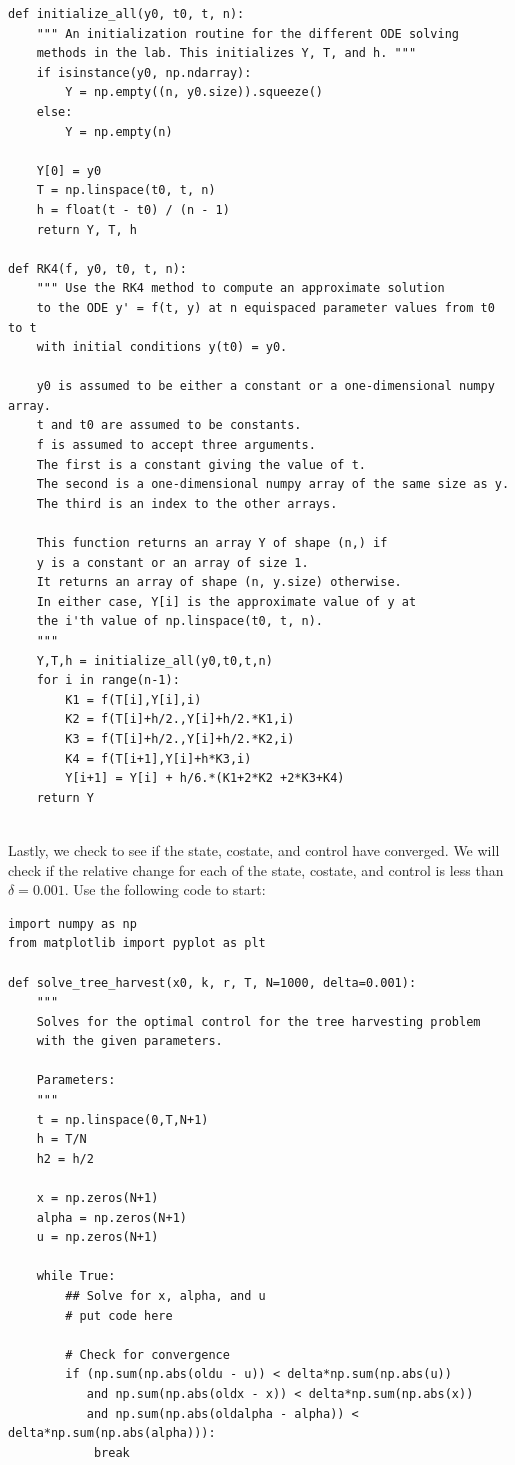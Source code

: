 \begin{lstlisting}
def initialize_all(y0, t0, t, n):
    """ An initialization routine for the different ODE solving
    methods in the lab. This initializes Y, T, and h. """
    if isinstance(y0, np.ndarray):
        Y = np.empty((n, y0.size)).squeeze()
    else:
        Y = np.empty(n)
    
    Y[0] = y0
    T = np.linspace(t0, t, n)
    h = float(t - t0) / (n - 1)
    return Y, T, h

def RK4(f, y0, t0, t, n):
    """ Use the RK4 method to compute an approximate solution
    to the ODE y' = f(t, y) at n equispaced parameter values from t0 to t
    with initial conditions y(t0) = y0.
    
    y0 is assumed to be either a constant or a one-dimensional numpy array.
    t and t0 are assumed to be constants.
    f is assumed to accept three arguments.
    The first is a constant giving the value of t.
    The second is a one-dimensional numpy array of the same size as y.
    The third is an index to the other arrays.
    
    This function returns an array Y of shape (n,) if
    y is a constant or an array of size 1.
    It returns an array of shape (n, y.size) otherwise.
    In either case, Y[i] is the approximate value of y at
    the i'th value of np.linspace(t0, t, n).
    """
    Y,T,h = initialize_all(y0,t0,t,n)
    for i in range(n-1):
        K1 = f(T[i],Y[i],i)
        K2 = f(T[i]+h/2.,Y[i]+h/2.*K1,i)
        K3 = f(T[i]+h/2.,Y[i]+h/2.*K2,i)
        K4 = f(T[i+1],Y[i]+h*K3,i)
        Y[i+1] = Y[i] + h/6.*(K1+2*K2 +2*K3+K4)
    return Y
            
\end{lstlisting}


Lastly, we check to see if the state, costate, and control have converged.
We will check if the relative change for each of the state, costate, and control is less than \(\delta = 0.001\).
Use the following code to start:

\begin{lstlisting}
import numpy as np
from matplotlib import pyplot as plt

def solve_tree_harvest(x0, k, r, T, N=1000, delta=0.001):
    """
    Solves for the optimal control for the tree harvesting problem 
    with the given parameters.
    
    Parameters:
    """
    t = np.linspace(0,T,N+1)
    h = T/N
    h2 = h/2
    
    x = np.zeros(N+1)
    alpha = np.zeros(N+1)
    u = np.zeros(N+1)
    
    while True:
        ## Solve for x, alpha, and u
        # put code here
        
        # Check for convergence
        if (np.sum(np.abs(oldu - u)) < delta*np.sum(np.abs(u))
           and np.sum(np.abs(oldx - x)) < delta*np.sum(np.abs(x))
           and np.sum(np.abs(oldalpha - alpha)) < delta*np.sum(np.abs(alpha))):
            break
            
\end{lstlisting}

